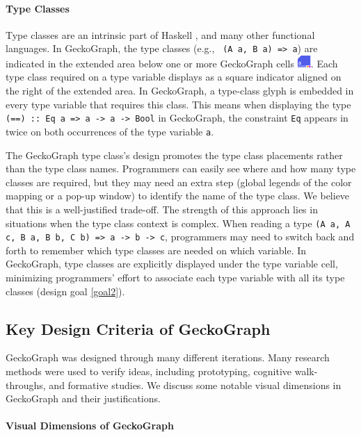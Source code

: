 \documentclass[preprint,12pt]{elsarticle}
\begin{document}
 
\paragraph{Type Classes} 
Type classes are an intrinsic part of Haskell \cite{Hudak2007-kn}, and many other functional languages. In GeckoGraph, the type classes (e.g., \texttt{ (A a, B a) => a}) are indicated in the extended area below one or more GeckoGraph cells \includegraphics[height=1.2em]{figures/TypeClass.png}. Each type class required on a type variable displays as a square indicator aligned on the right of the extended area. In GeckoGraph, a type-class glyph is embedded in every type variable that requires this class. This means when displaying the type \texttt{(==) :: Eq a => 
a -> a -> Bool} in GeckoGraph, the constraint \texttt{Eq} appears in twice on both occurrences of the type variable \texttt{a}. 

The GeckoGraph type class's design promotes the type class placements rather than the type class names. Programmers can easily see where and how many type classes are required, but they may need an extra step (global legends of the color mapping or a pop-up window) to identify the name of the type class. We believe that this is a well-justified trade-off. The strength of this approach lies in situations when the type class context is complex. When reading a type \texttt{(A a, A c, B a, B b, C b) => a -> b -> c}, programmers may need to switch back and forth to remember which type classes are needed on which variable. In GeckoGraph, type classes are explicitly displayed under the type variable cell,  minimizing programmers' effort to associate each type variable with all its type classes (design goal \ref{goal2}). 


\subsection{Key Design Criteria of GeckoGraph}\label{sec:benefits}

GeckoGraph was designed through many different iterations. Many research methods were used to verify ideas, including prototyping, cognitive walk-throughs, and formative studies. We discuss some notable visual dimensions in GeckoGraph and their justifications.


\paragraph{Visual Dimensions of GeckoGraph}
\end{document}
